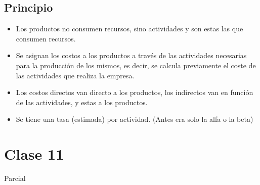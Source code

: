 \documentclass[titlepage,a4paper]{article}
\begin{document}
\subsection*{Principio}

\begin{itemize}
\item Los productos no consumen recursos, sino actividades y son estas las que consumen recursos. 
\item Se asignan los costos a los productos a través de las actividades necesarias para la producción de los mismos, es decir, se calcula previamente el coste de las actividades que realiza la empresa.
\item Los costos directos van directo a los productos, los indirectos van en función de las actividades, y estas a los productos.
\item Se tiene una tasa (estimada) por actividad. (Antes era solo la alfa o la beta)
\end{itemize}
 





\section*{Clase 11}
Parcial
% 
% 
% 
% 
%
\end{document}
